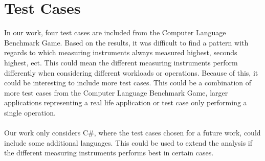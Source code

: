 \section{Test Cases}

In our work, four test cases are included from the Computer Language Benchmark Game. Based on the results, it was difficult to find a pattern with regards to which measuring instruments always measured highest, seconds highest, ect. This could mean the different measuring instruments perform differently when considering different workloads or operations. Because of this, it could be interesting to include more test cases. This could be a combination of more test cases from the Computer Language Benchmark Game, larger applications representing a real life application or test case only performing a single operation.

\paragraph*{}
Our work only considers C\#, where the test cases chosen for a future work, could include some additional languages. This could be used to extend the analysis if the different measuring instruments performs best in certain cases.